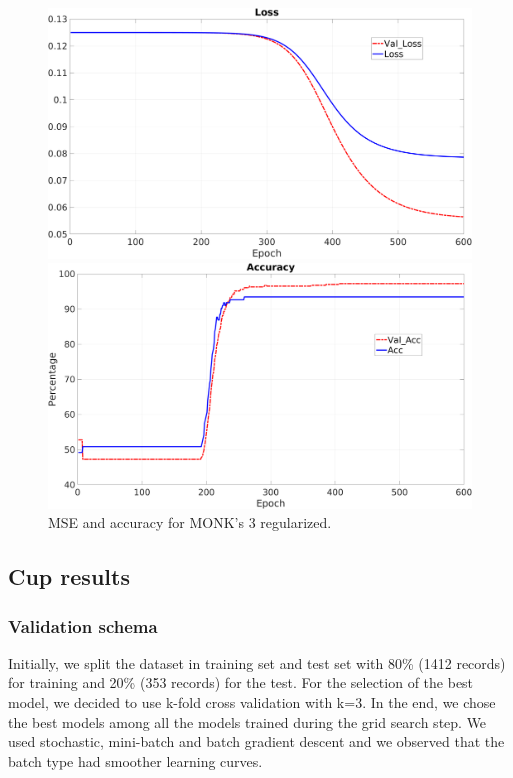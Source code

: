\begin{figure}[H]
    \centering
    \begin{minipage}[t]{0.5\linewidth}
        \includegraphics[width=\linewidth]{img/Monk3_loss_Reg.png}
    \end{minipage}%
    \begin{minipage}[t]{0.5\linewidth}
        \includegraphics[width=\linewidth]{img/Monk3_accuracy_Reg.png}
    \end{minipage}
    \caption{MSE and accuracy for MONK’s 3 regularized.}
\end{figure}



\subsection{Cup results}

\subsubsection{Validation schema}
Initially, we split the dataset in training set and test set with 80\% (1412 records) for training and 20\% (353 records) for the test. For the selection of the best model, we decided to use k-fold cross validation with k=3. In the end, we chose the best models among all the models trained during the grid search step. We used stochastic, mini-batch and batch gradient descent and we observed that the batch type had smoother learning curves.

